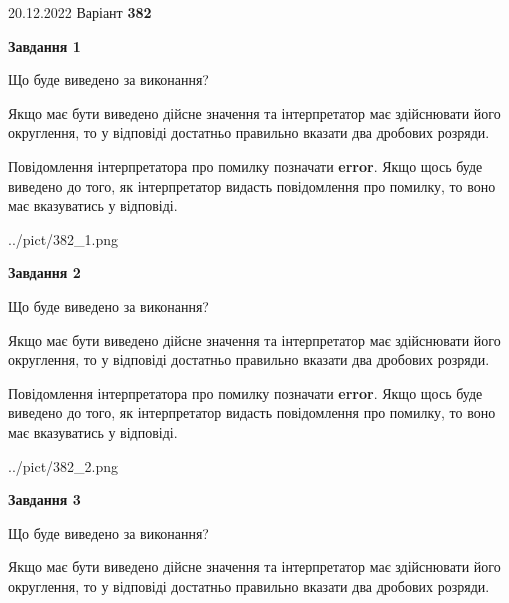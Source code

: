 \documentclass[12pt, ukrainian]{article}
\begin{document}
{20.12.2022 Варіант \No \textbf { 382 }\par}
{
\begin {Large}

{\begin {center}\textbf{Завдання 1}\end {center}}\par
Що буде виведено за виконання? \par

Якщо має бути виведено дійсне значення та інтерпретатор має здійснювати його округлення, 
то у відповіді достатньо правильно вказати два дробових розряди.

Повідомлення інтерпретатора про помилку позначати \textbf{error}.
Якщо щось буде виведено до того, як інтерпретатор видасть повідомлення про помилку, 
то воно має вказуватись у відповіді. \par

\begin{center}
	{../pict/382_1.png}
\end{center}
\newpage

{\begin {center}\textbf{Завдання 2}\end {center}}\par
Що буде виведено за виконання? \par

Якщо має бути виведено дійсне значення та інтерпретатор має здійснювати його округлення, 
то у відповіді достатньо правильно вказати два дробових розряди.

Повідомлення інтерпретатора про помилку позначати \textbf{error}.
Якщо щось буде виведено до того, як інтерпретатор видасть повідомлення про помилку, 
то воно має вказуватись у відповіді. \par

\begin{center}
	{../pict/382_2.png}
\end{center}
\newpage

{\begin {center}\textbf{Завдання 3}\end {center}}\par
Що буде виведено за виконання? \par

Якщо має бути виведено дійсне значення та інтерпретатор має здійснювати його округлення, 
то у відповіді достатньо правильно вказати два дробових розряди.


\end{Large}}
\end{document}
